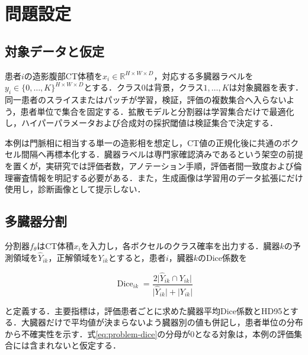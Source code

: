 \chapter{問題設定}

\begin{center}
  \UsamiFictionalExampleNotice
\end{center}

\section{対象データと仮定}

患者$i$の造影腹部CT体積を$x_i\in\mathbb{R}^{H\times W\times D}$，対応する多臓器ラベルを$y_i\in\{0,\ldots,K\}^{H\times W\times D}$とする．クラス0は背景，クラス$1,\ldots,K$は対象臓器を表す．同一患者のスライスまたはパッチが学習，検証，評価の複数集合へ入らないよう，患者単位で集合を固定する．拡散モデルと分割器は学習集合だけで最適化し，ハイパーパラメータおよび合成対の採択閾値は検証集合で決定する．

本例は門脈相に相当する単一の造影相を想定し，CT値の正規化後に共通のボクセル間隔へ再標本化する．臓器ラベルは専門家確認済みであるという架空の前提を置くが，実研究では評価者数，アノテーション手順，評価者間一致度および倫理審査情報を明記する必要がある．また，生成画像は学習用のデータ拡張にだけ使用し，診断画像として提示しない．

\section{多臓器分割}

分割器$f_{\theta}$はCT体積$x_i$を入力し，各ボクセルのクラス確率を出力する．臓器$k$の予測領域を$\hat{Y}_{ik}$，正解領域を$Y_{ik}$とすると，患者$i$，臓器$k$のDice係数を

\begin{equation}
  \operatorname{Dice}_{ik}
  =\frac{2\lvert\hat{Y}_{ik}\cap Y_{ik}\rvert}
  {\lvert\hat{Y}_{ik}\rvert+\lvert Y_{ik}\rvert}
  \label{eq:problem-dice}
\end{equation}

と定義する．主要指標は，評価患者ごとに求めた臓器平均Dice係数とHD95とする．大臓器だけで平均値が決まらないよう臓器別の値も併記し，患者単位の分布から不確実性を示す．式\eqref{eq:problem-dice}の分母が0となる対象は，本例の評価集合には含まれないと仮定する．

